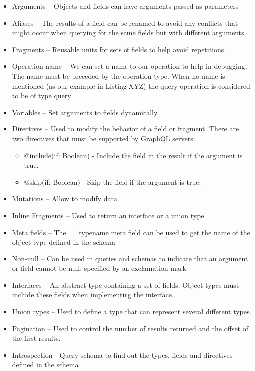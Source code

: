 \begin{itemize}
\item Arguments – Objects and fields can have arguments passed as parameters

\item Aliases – The results of a field can be renamed to avoid any conflicts that might occur when querying for the same fields but with different arguments. 

\item Fragments – Reusable units for sets of fields to help avoid repetitions.

\item Operation name – We can set a name to our operation to help in debugging. The name must be preceded by the operation type. When no name is mentioned (as our example in Listing XYZ) the query operation is considered to be of type query 

\item Variables – Set arguments to fields dynamically

\item Directives – Used to modify the behavior of a field or fragment. There are two directives that must be supported by GraphQL servers: 

\begin{itemize}
\item @include(if: Boolean) -  Include the field in the result if the argument is true.
\item @skip(if: Boolean) -  Skip the field if the argument is true.
\end{itemize}

\item Mutations – Allow to modify data

\item Inline Fragments – Used to return an interface or a union type

\item Meta fields – The \_\_typename meta field can be used to get the name of the object type defined in the schema


\item Non-null – Can be used in queries and schemas to indicate that an argument or field cannot be null; specified by an exclamation mark 


\item Interfaces – An abstract type containing a set of fields. Object types must include these fields when implementing the interface.


\item Union types – Used to define a type that can represent several different types.

\item Pagination – Used to control the number of results returned and the offset of the first results. 

\item Introspection  - Query schema to find out the types, fields and directives defined in the schema
\end{itemize}

